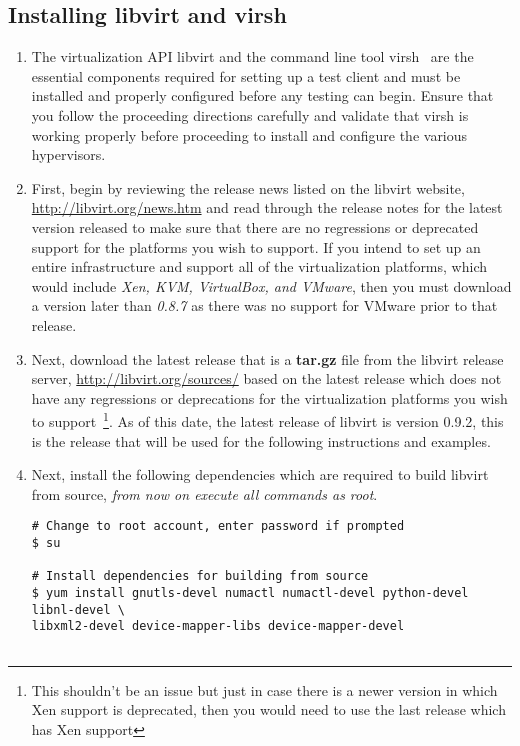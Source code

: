 \subsection{Installing libvirt and virsh}
\label{sec:rhvirsh}
\begin{enumerate}
\item	The virtualization API libvirt and the command line tool virsh~\cite{libvirt} are the essential components required 
		for setting up a test client and must be installed and properly configured before any testing can begin. Ensure that
		you follow the proceeding directions carefully and validate that virsh is working properly before proceeding to 
		install and configure the various hypervisors.
		
\item	First, begin by reviewing the release news listed on the libvirt website, \url{http://libvirt.org/news.htm} and read 
		through the release notes for the latest version released to make sure that there are no regressions or deprecated 
		support for the platforms you wish to support. If you intend to set up an entire infrastructure and support all of the
		\cernvm virtualization platforms, which would include \emph{Xen, KVM, VirtualBox, and VMware}, then you must download
		a version later than \emph{0.8.7} as there was no support for VMware prior to that release.

\item	Next, download the latest release that is a {\bf tar.gz} file from the libvirt release server, 
		\url{http://libvirt.org/sources/} based on the latest release which does not have any regressions or deprecations for
		the virtualization platforms you wish to support~\footnote{This shouldn't be an issue but just in case there is a 
		newer version in which Xen support is deprecated, then you would need to use the last release which has Xen support}.
		As of this date, the latest release of libvirt is version 0.9.2, this is the release that will be used for the
		following instructions and examples.
		
\item	Next, install the following dependencies which are required to build libvirt from source, \emph{from now on execute all 
			commands as root}.
		
\lstset{language=bash,caption=Install Dependencies}
\begin{lstlisting}
# Change to root account, enter password if prompted
$ su

# Install dependencies for building from source
$ yum install gnutls-devel numactl numactl-devel python-devel libnl-devel \
libxml2-devel device-mapper-libs device-mapper-devel


\end{lstlisting}
\end{enumerate}
